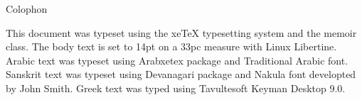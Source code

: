 \documentclass[a4paper,14pt]{memoir}
\begin{document}
\clearpage
{}
\pagestyle{headings}



\tableofcontents*   %
%


\mainmatter
{}
\pagestyle{ocd}















\backmatter

\printindex

\cleardoublepage
\pagestyle{empty}
\null\vfil

\begin{adjustwidth}{1in}{1in}
\begin{center}
{\Large\textsf{Colophon}}
\end{center}
\begin{center}
  This document was typeset using the xeTeX typesetting system
  and the memoir class. The body text is set to 14pt on a
  33pc measure with Linux Libertine. Arabic text was typeset using Arabxetex
	package and Traditional Arabic font. Sanskrit text was typeset using
	Devanagari package and Nakula font developted by John Smith.
	Greek text was typed using Tavultesoft Keyman Desktop 9.0.
\end{center}
\end{adjustwidth}

\vfil
\end{document}
